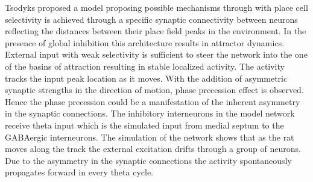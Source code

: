 Tsodyks \cite{Tsodyks1996} proposed a model proposing possible mechanisms through with place cell selectivity is achieved through a specific synaptic connectivity between neurons reflecting the distances between their place field peaks in the environment. In the presence of global inhibition this architecture results in attractor dynamics. External input with weak selectivity is sufficient to steer the network into the one of the basins of attraction resulting in stable localized activity. The activity tracks the input peak location as it moves. With the addition of asymmetric synaptic strengths in the direction of motion, phase precession effect is observed. Hence the phase precession could be a manifestation of the inherent asymmetry in the synaptic connections. The inhibitory interneurons in the model network receive theta input which is the simulated input from medial septum to the GABAergic interneurons. The simulation of the network shows that as the rat moves along the track the external excitation drifts through a group of neurons. Due to the asymmetry in the synaptic connections the activity spontaneously propagates forward in every theta cycle. \\  


